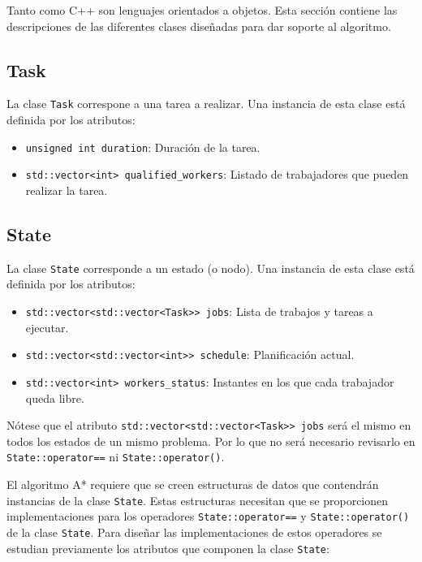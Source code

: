 Tanto \Python como C++ son lenguajes orientados a objetos.
Esta sección contiene las descripciones de las diferentes
clases diseñadas para dar soporte al algoritmo.

\subsection{Task}

La clase \lstinline{Task} correspone a una tarea a realizar.
Una instancia de esta clase está definida por los atributos:
\begin{itemize}[itemsep=0.25px]
    \item \lstinline{unsigned int duration}: Duración de la tarea.
    \item \lstinline{std::vector<int> qualified_workers}: Listado de trabajadores que pueden realizar la tarea.
\end{itemize}

\subsection{State}

La clase \lstinline{State} corresponde a un estado (o nodo).
Una instancia de esta clase está definida por los atributos:
\begin{itemize}[itemsep=0.25px]
    \item \lstinline{std::vector<std::vector<Task>> jobs}: Lista de trabajos y tareas a ejecutar.
    \item \lstinline{std::vector<std::vector<int>> schedule}: Planificación actual.
    \item \lstinline{std::vector<int> workers_status}: Instantes en los que cada trabajador queda libre.
\end{itemize}

\begin{notebox}
    Nótese que el atributo \lstinline{std::vector<std::vector<Task>> jobs} será el mismo
    en todos los estados de un mismo problema.
    Por lo que no será necesario revisarlo en
    \lstinline{State::operator==} ni \lstinline{State::operator()}.
\end{notebox}

El algoritmo A* requiere que se creen estructuras de datos que contendrán instancias
de la clase \lstinline{State}.
Estas estructuras necesitan que se proporcionen implementaciones para los operadores
\lstinline{State::operator==} y \lstinline{State::operator()} de la clase \lstinline{State}.
Para diseñar las implementaciones de estos operadores
se estudian previamente los atributos que componen la clase \lstinline{State}:

